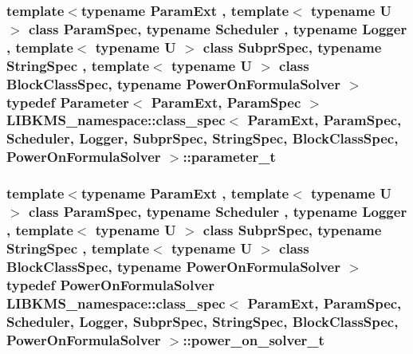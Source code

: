 \hypertarget{structLIBKMS__namespace_1_1class__spec_a9dcd59cf4458e0bd59d72eaf15d0ed0e}{
\subsubsection[{parameter\-\_\-t}]{\setlength{\rightskip}{0pt plus 5cm}template$<$typename Param\-Ext , template$<$ typename U $>$ class Param\-Spec, typename Scheduler , typename Logger , template$<$ typename U $>$ class Subpr\-Spec, typename String\-Spec , template$<$ typename U $>$ class Block\-Class\-Spec, typename Power\-On\-Formula\-Solver $>$ typedef {\bf Parameter}$<$ Param\-Ext, Param\-Spec $>$ {\bf L\-I\-B\-K\-M\-S\-\_\-namespace\-::class\-\_\-spec}$<$ Param\-Ext, Param\-Spec, Scheduler, Logger, Subpr\-Spec, String\-Spec, Block\-Class\-Spec, Power\-On\-Formula\-Solver $>$\-::{\bf parameter\-\_\-t}}}\label{structLIBKMS__namespace_1_1class__spec_a9dcd59cf4458e0bd59d72eaf15d0ed0e}
\hypertarget{structLIBKMS__namespace_1_1class__spec_ae650b07a7b46bdfde5f0bb07761523de}{
\subsubsection[{power\-\_\-on\-\_\-solver\-\_\-t}]{\setlength{\rightskip}{0pt plus 5cm}template$<$typename Param\-Ext , template$<$ typename U $>$ class Param\-Spec, typename Scheduler , typename Logger , template$<$ typename U $>$ class Subpr\-Spec, typename String\-Spec , template$<$ typename U $>$ class Block\-Class\-Spec, typename Power\-On\-Formula\-Solver $>$ typedef Power\-On\-Formula\-Solver {\bf L\-I\-B\-K\-M\-S\-\_\-namespace\-::class\-\_\-spec}$<$ Param\-Ext, Param\-Spec, Scheduler, Logger, Subpr\-Spec, String\-Spec, Block\-Class\-Spec, Power\-On\-Formula\-Solver $>$\-::{\bf power\-\_\-on\-\_\-solver\-\_\-t}}}\label{structLIBKMS__namespace_1_1class__spec_ae650b07a7b46bdfde5f0bb07761523de}
